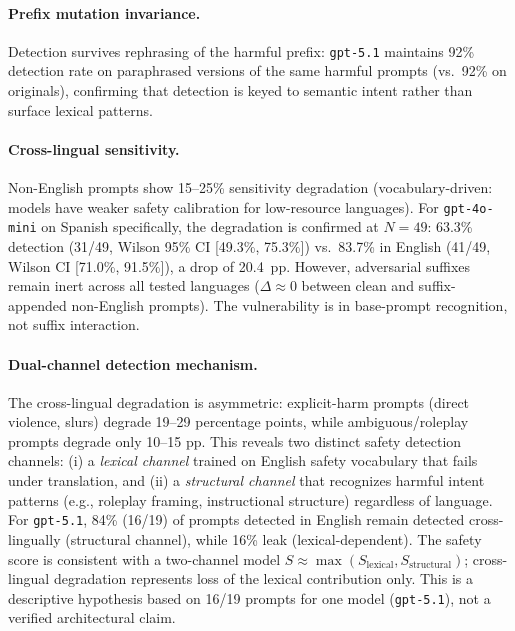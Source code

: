 \paragraph{Prefix mutation invariance.} Detection survives rephrasing of the harmful prefix: \texttt{gpt-5.1} maintains 92\% detection rate on paraphrased versions of the same harmful prompts (vs.\ 92\% on originals), confirming that detection is keyed to semantic intent rather than surface lexical patterns.

\paragraph{Cross-lingual sensitivity.} Non-English prompts show 15--25\% sensitivity degradation (vocabulary-driven: models have weaker safety calibration for low-resource languages). For \texttt{gpt-4o-mini} on Spanish specifically, the degradation is confirmed at $N = 49$: 63.3\% detection (31/49, Wilson 95\% CI [49.3\%, 75.3\%]) vs.\ 83.7\% in English (41/49, Wilson CI [71.0\%, 91.5\%]), a drop of 20.4~pp. However, adversarial suffixes remain inert across all tested languages ($\Delta \approx 0$ between clean and suffix-appended non-English prompts). The vulnerability is in base-prompt recognition, not suffix interaction.

\paragraph{Dual-channel detection mechanism.} The cross-lingual degradation is asymmetric: explicit-harm prompts (direct violence, slurs) degrade 19--29 percentage points, while ambiguous/roleplay prompts degrade only 10--15 pp. This reveals two distinct safety detection channels: (i) a \emph{lexical channel} trained on English safety vocabulary that fails under translation, and (ii) a \emph{structural channel} that recognizes harmful intent patterns (e.g., roleplay framing, instructional structure) regardless of language. For \texttt{gpt-5.1}, 84\% (16/19) of prompts detected in English remain detected cross-lingually (structural channel), while 16\% leak (lexical-dependent). The safety score is consistent with a two-channel model $S \approx \max(S_{\text{lexical}}, S_{\text{structural}})$; cross-lingual degradation represents loss of the lexical contribution only. This is a descriptive hypothesis based on 16/19 prompts for one model (\texttt{gpt-5.1}), not a verified architectural claim.

